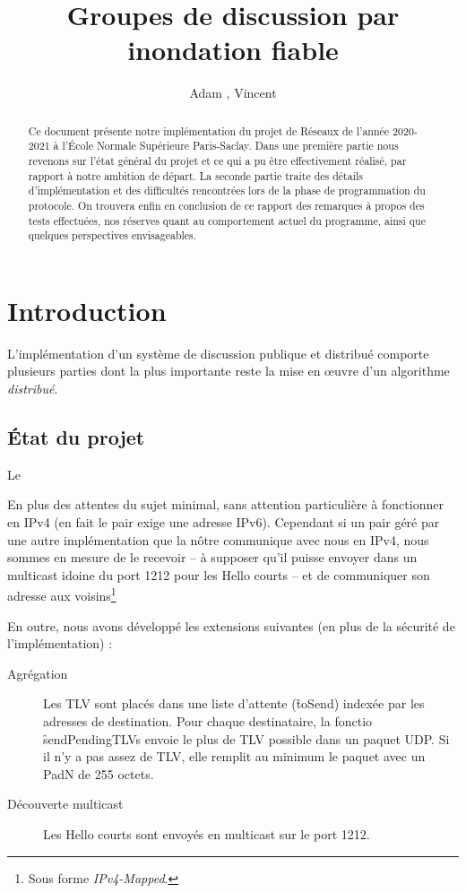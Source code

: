 \documentclass[11pt,a4paper]{article}
\title{Groupes de discussion par inondation fiable}
\author{Adam \bsc{Phillips}, Vincent \bsc{Bonczak}}
\begin{document}
  \maketitle
	
	\begin{abstract}
	Ce document présente notre implémentation du projet de Réseaux de l'année 2020-2021 à l'École Normale Supérieure Paris-Saclay. Dans une première partie
	nous revenons sur l'état général du projet et ce qui a pu être effectivement réalisé, par rapport à notre ambition de départ. La seconde partie traite 
	des détails d'implémentation et des difficultés rencontrées lors de la phase de programmation du protocole. On trouvera enfin en conclusion de ce rapport
	des remarques à propos des tests effectuées, nos réserves quant au comportement actuel du programme, ainsi que quelques perspectives envisageables.
	\end{abstract}
	
	
\section{Introduction}

L'implémentation d'un système de discussion publique et distribué comporte plusieurs parties dont la plus importante reste la mise en œuvre d'un algorithme \emph{distribué}.

\subsection{État du projet}

Le 

En plus des attentes du sujet minimal, sans attention particulière à fonctionner en IPv4 (en fait le pair exige une adresse IPv6). Cependant si un pair géré par
une autre implémentation que la nôtre communique avec nous en IPv4, nous sommes en mesure de le recevoir -- à supposer qu'il puisse envoyer dans un multicast 
idoine du port 1212 pour les Hello courts -- et de communiquer son adresse aux voisins\footnote{Sous forme \emph{IPv4-Mapped}.} 

En outre, nous avons développé les extensions suivantes (en plus de la sécurité de l'implémentation) :
\begin{description}
\item[Agrégation] Les TLV sont placés dans une liste d'attente (\f{toSend}) indexée par les adresses de destination. Pour chaque destinataire, la fonctio \f{sendPendingTLVs}
envoie le plus de TLV possible dans un paquet UDP. Si il n'y a pas assez de TLV, elle remplit au minimum le paquet avec un PadN de 255 octets.
\item[Découverte multicast]Les Hello courts sont envoyés en multicast sur le port 1212.
\end{description}
\end{document}
